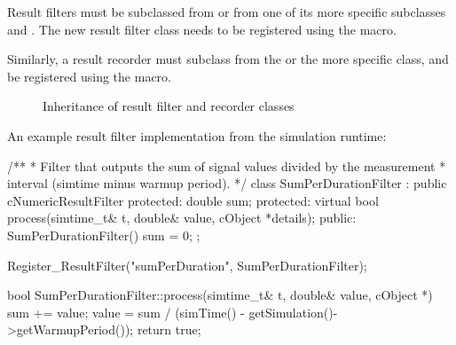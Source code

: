 Result filters must be subclassed from  or from one
of its more specific subclasses  and
. The new result filter class needs to be
registered using the  macro.

Similarly, a result recorder must subclass from the
 or the more specific
 class, and be registered using the
 macro.

\begin{figure}[htbp]
  \begin{center}
    
    \caption{Inheritance of result filter and recorder classes}
  \end{center}
\end{figure}

An example result filter implementation from the simulation runtime:


\begin{cpp}
/**
 * Filter that outputs the sum of signal values divided by the measurement
 * interval (simtime minus warmup period).
 */
class SumPerDurationFilter : public cNumericResultFilter
{
    protected:
        double sum;
    protected:
        virtual bool process(simtime_t& t, double& value, cObject *details);
    public:
        SumPerDurationFilter() {sum = 0;}
};

Register_ResultFilter("sumPerDuration", SumPerDurationFilter);

bool SumPerDurationFilter::process(simtime_t& t, double& value, cObject *)
{
    sum += value;
    value = sum / (simTime() - getSimulation()->getWarmupPeriod());
    return true;
}
\end{cpp}


%
%
%
%
%


